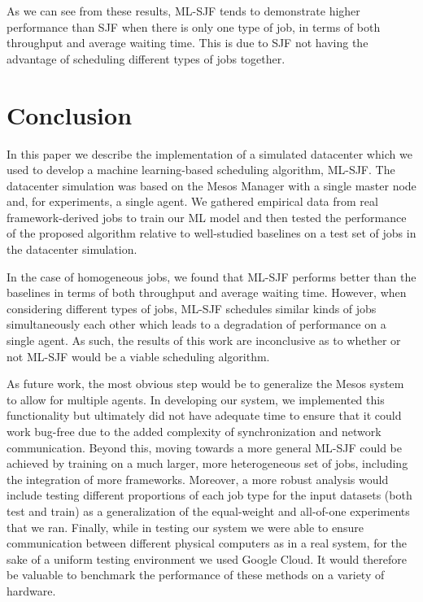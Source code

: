 \documentclass{hotnets19}
\begin{document}
As we can see from these results, ML-SJF tends to demonstrate higher performance than SJF when there is only one type of job, in terms of both throughput and average waiting time.
This is due to SJF not having the advantage of scheduling different types of jobs together.

\section{Conclusion}
In this paper we describe the implementation of a simulated datacenter which we used to develop a machine learning-based scheduling algorithm, ML-SJF. The datacenter simulation was based on the Mesos Manager with a single master node and, for experiments, a single agent. We gathered empirical data from real framework-derived jobs to train our ML model and then tested the performance of the proposed algorithm relative to well-studied baselines on a test set of jobs in the datacenter simulation.

In the case of homogeneous jobs, we found that ML-SJF performs better than the baselines in terms of both throughput and average waiting time.
However, when considering different types of jobs, ML-SJF schedules similar kinds of jobs simultaneously each other which leads to a degradation of performance on a single agent. As such, the results of this work are inconclusive as to whether or not ML-SJF would be a viable scheduling algorithm.

As future work, the most obvious step would be to generalize the Mesos system to allow for multiple agents. In developing our system, we implemented this functionality but ultimately did not have adequate time to ensure that it could work bug-free due to the added complexity of synchronization and network communication. Beyond this, moving towards a more general ML-SJF could be achieved by training on a much larger, more heterogeneous set of jobs, including the integration of more frameworks. Moreover, a more robust analysis would include testing different proportions of each job type for the input datasets (both test and train) as a generalization of the equal-weight and all-of-one experiments that we ran. Finally, while in testing our system we were able to ensure communication between different physical computers as in a real system, for the sake of a uniform testing environment we used Google Cloud. It would therefore be valuable to benchmark the performance of these methods on a variety of hardware.



\end{document}
